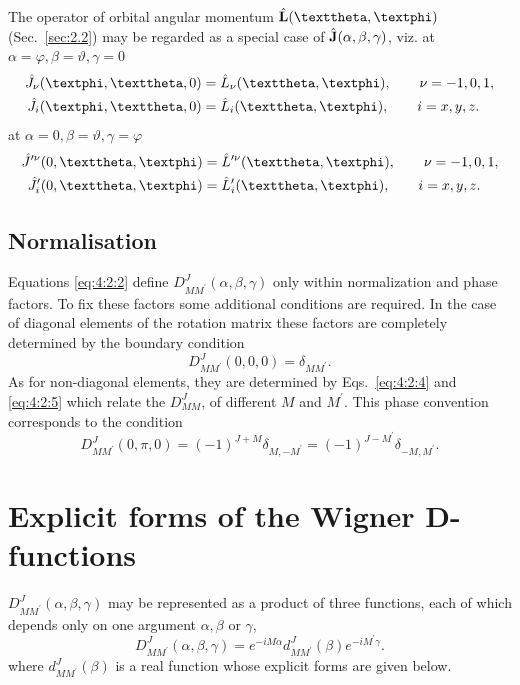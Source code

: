The operator of orbital angular momentum $\hat{\vect{L}}(\vartheta, \varphi)$ (Sec.~\ref{sec:2.2}) may be regarded as a special case of $\hat{\mathbf{J}}(\alpha, \beta, \gamma)$, viz. at $\alpha=\varphi, \beta=\vartheta, \gamma=0$
\begin{align}
\hat{J}_{\nu}(\varphi, \vartheta, 0) & =\hat{L}_{\nu}(\vartheta, \varphi), \qquad \nu  =-1,0,1  ,\notag\\
\hat{J}_{i}(\varphi, \vartheta, 0) & =\hat{L}_{i}(\vartheta, \varphi), \qquad i  =x, y, z .\label{eq:4:2:13}
\end{align}
at $\alpha=0, \beta=\vartheta, \gamma=\varphi$
\begin{align}
\hat{J}^{\prime\nu}(0, \vartheta, \varphi) & =\hat{L}^{\prime \nu}(\vartheta, \varphi), \qquad  \nu=-1,0,1,  \notag\\
\hat{J}^\prime_{i}(0, \vartheta, \varphi) & =\hat{L}_{i}^{\prime}(\vartheta, \varphi), \qquad  i=x, y, z. \label{eq:4:2:14}
\end{align}
\subsection{Normalisation}
Equations \eqref{eq:4:2:2} define $D_{M M^{\prime}}^{J}(\alpha, \beta, \gamma)$ only within normalization and phase factors. To fix these factors some additional conditions are required. In the case of diagonal elements of the rotation matrix these factors are completely determined by the boundary condition
\begin{equation}
D_{M M^{\prime}}^{J}(0,0,0)=\delta_{M M^{\prime}} .\label{eq:4:2:15}
\end{equation}
As for non-diagonal elements, they are determined by Eqs.~\eqref{eq:4:2:4} and \eqref{eq:4:2:5} which relate the $D_{M M}^{J}$, of different $M$ and $M^{\prime}$. This phase convention corresponds to the condition
\begin{equation}
D_{M M^{\prime}}^{J}(0, \pi, 0)=(-1)^{J+M} \delta_{M,-M^{\prime}}=(-1)^{J-M^{\prime}} \delta_{-M, M^{\prime}}. \label{eq:4:2:16}
\end{equation}

\section{Explicit forms of the Wigner D-functions}\label{sec:4.3}
$D_{M M^{\prime}}^{J}(\alpha, \beta, \gamma)$ may be represented as a product of three functions, each of which depends only on one argument $\alpha, \beta$ or $\gamma$,
\begin{equation}
D_{M M^{\prime}}^{J}(\alpha, \beta, \gamma)=e^{-i M \alpha} d_{M M^{\prime}}^{J}(\beta) e^{-i M^{\prime} \gamma}. \label{eq:4:3:1}
\end{equation}
where $d_{M M^{\prime}}^{J}(\beta)$ is a real function whose explicit forms are given below.

